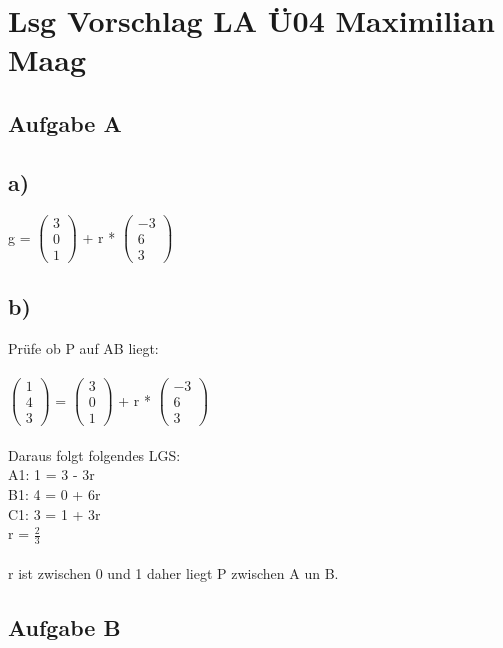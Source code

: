 \documentclass{article}
\begin{document}
	\section*{Lsg Vorschlag LA Ü04 Maximilian Maag}
	\subsection*{Aufgabe A}
	\subsection*{a)}
	g =
	$
	\left(\begin{array}{c}
	3 \\ 0 \\ 1
	\end{array}\right)
	$
	+
	r *
	$
	\left(\begin{array}{c}
	-3 \\ 6 \\ 3
	\end{array}\right)
	$
	
	\subsection*{b)}
	Prüfe ob P auf AB liegt: \\	\\
	$
	\left(\begin{array}{c}
	1 \\ 4 \\ 3
	\end{array}\right)
	$	=
	$
	\left(\begin{array}{c}
	3 \\ 0 \\ 1
	\end{array}\right)
	$
	+
	r *
	$
	\left(\begin{array}{c}
	-3 \\ 6 \\ 3
	\end{array}\right)
	$
	\\ \\
	Daraus folgt folgendes LGS: \\
	A1: 1 = 3 - 3r \\
	B1: 4 = 0 + 6r \\
	C1: 3 = 1 + 3r \\
	r = $\frac{2}{3}$ \\ \\
	r ist zwischen 0 und 1 daher liegt P zwischen A un B.
	\subsection*{Aufgabe B}
\end{document}
